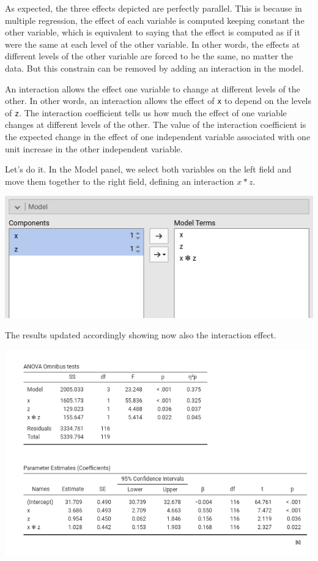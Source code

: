 \documentclass[
]{book}
\begin{document}
As expected, the three effects depicted are perfectly parallel. This is because in multiple regression, the effect of each variable is computed keeping constant the other variable, which is equivalent to saying that the effect is computed as if it were the same at each level of the other variable. In other words, the effects at different levels of the other variable are forced to be the same, no matter the data. But this constrain can be removed by adding an interaction in the model.

An interaction allows the effect one variable to change at different levels of the other. In other words, an interaction allows the effect of \texttt{x} to depend on the levels of \texttt{z}. The interaction coefficient tells us how much the effect of one variable changes at different levels of the other. The value of the interaction coefficient is the expected change in the effect of one independent variable associated with one unit increase in the other independent variable.

Let's do it. In the {Model} panel, we select both variables on the left field and move them together to the right field, defining an interaction \(x*z\).

\includegraphics[width=7.69in]{bookletpics/2_input11}

The results updated accordingly showing now also the interaction effect.

\includegraphics[width=9.19in]{bookletpics/2_output11}
\end{document}
